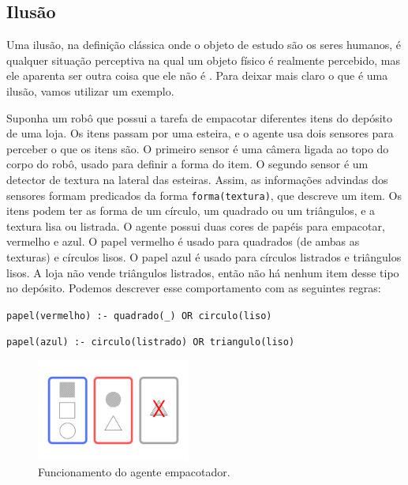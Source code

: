 \subsection{Ilusão}

Uma ilusão, na definição clássica onde o objeto de estudo são os seres humanos, é qualquer situação perceptiva na qual um objeto físico é realmente percebido, mas ele aparenta ser outra coisa que ele não é \cite{Smith2002-SMITPO-17}. Para deixar mais claro o que é uma ilusão, vamos utilizar um exemplo.


\begin{example}{}
Suponha um robô que possui a tarefa de empacotar diferentes itens do depósito de uma loja. Os itens passam por uma esteira, e o agente usa dois sensores para perceber o que os itens são. O primeiro sensor é uma câmera ligada ao topo do corpo do robô, usado para definir a forma do item. O segundo sensor é um detector de textura na lateral das esteiras. Assim, as informações advindas dos sensores formam predicados da forma \texttt{forma(textura)}, que descreve um item. Os itens podem ter as forma de um círculo, um quadrado ou um triângulos, e a textura lisa ou listrada.
O agente possui duas cores de papéis para empacotar, vermelho e azul. O papel vermelho é usado para quadrados (de ambas as texturas) e círculos lisos. O papel azul é usado para círculos listrados e triângulos lisos. A loja não vende triângulos listrados, então não há nenhum item desse tipo no depósito. Podemos descrever esse comportamento com as seguintes regras:

\begin{center}
    \texttt{papel(vermelho) :- quadrado(\_) OR circulo(liso)}
\end{center}
\begin{center}
     \texttt{papel(azul) :- circulo(listrado) OR triangulo(liso)}
\end{center}

\begin{figure}[h!]
    \centering
    \includegraphics[width=0.45\textwidth]{Images/img1}
    \caption{Funcionamento do agente empacotador.}
    \label{fig:method}
\end{figure}
\label{example::robo}
\end{example}

